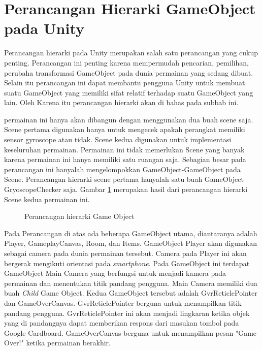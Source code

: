 \section{Perancangan Hierarki GameObject pada Unity}
\label{sec:perancangan_hierarki_gameobject_pada_unity}

Perancangan hierarki pada Unity merupakan salah satu perancangan yang cukup penting. Perancangan ini penting karena mempermudah pencarian, pemilihan, perubaha transformasi GameObject pada dunia permainan yang sedang dibuat. Selain itu perancangan ini dapat membantu pengguna Unity untuk membuat suatu GameObject yang memiliki sifat relatif terhadap suatu GameObject yang lain. Oleh Karena itu perancangan hierarki akan di bahas pada subbab ini.

permainan ini hanya akan dibangun dengan menggunakan dua buah scene saja. Scene pertama digunakan hanya untuk mengecek apakah perangkat memiliki sensor gyroscope atau tidak. Scene kedua digunakan untuk implementasi keseluruhan permainan. Permainan ini tidak memerlukan Scene yang banyak karena permainan ini hanya memiliki satu ruangan saja. Sebagian besar pada perancangan ini hanyalah mengelompokkan GameObject-GameObject pada Scene. Perancangan hierarki scene pertama hanyalah satu buah GameObject GryoscopeChecker saja. Gambar \ref{fig:perancangan_hierarki_game_object} merupakan hasil dari perancangan hierarki Scene kedua permainan ini.
\begin{figure}[hbtp]
\caption{Perancangan hierarki Game Object}
\label{fig:perancangan_hierarki_game_object}
\end{figure}

Pada Perancangan di atas ada beberapa GameObject utama, diantaranya adalah Player, GameplayCanvas, Room, dan Items. GameObject Player akan digunakan sebagai camera pada dunia permainan tersebut. Camera pada Player ini akan bergerak mengikuti orientasi pada \textit{smartphone}. Pada GameObject ini terdapat GameObject Main Camera yang berfungsi untuk menjadi kamera pada permainan dan menentukan titik pandang pengguna. Main Camera memiliki dua buah \textit{Child} Game Object. Kedua GameObject tersebut adalah GvrReticlePointer dan GameOverCanvas. GvrReticlePointer berguna untuk menampilkan titik pandang pengguna. GvrReticlePointer ini akan menjadi lingkaran ketika objek yang di pandangnya dapat memberikan respons dari masukan tombol pada Google Cardboard. GameOverCanvas berguna untuk menampilkan pesan "Game Over!" ketika permainan berakhir.

